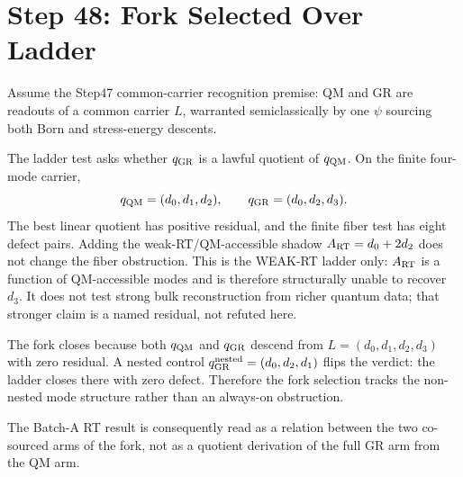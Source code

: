 \section*{Step 48: Fork Selected Over Ladder}

Assume the Step47 common-carrier recognition premise: QM and GR are readouts of
a common carrier \(L\), warranted semiclassically by one \(\psi\) sourcing both
Born and stress-energy descents.

The ladder test asks whether \(q_{\rm GR}\) is a lawful quotient of
\(q_{\rm QM}\). On the finite four-mode carrier,
\[
q_{\rm QM}=(d_0,d_1,d_2), \qquad q_{\rm GR}=(d_0,d_2,d_3).
\]
The best linear quotient has positive residual, and the finite fiber test has
eight defect pairs. Adding the weak-RT/QM-accessible shadow
\(A_{\rm RT}=d_0+2d_2\) does not change the fiber obstruction. This is the
WEAK-RT ladder only: \(A_{\rm RT}\) is a function of QM-accessible modes and is
therefore structurally unable to recover \(d_3\). It does not test strong bulk
reconstruction from richer quantum data; that stronger claim is a named
residual, not refuted here.

The fork closes because both \(q_{\rm QM}\) and \(q_{\rm GR}\) descend from
\(L=(d_0,d_1,d_2,d_3)\) with zero residual. A nested control
\(q_{\rm GR}^{\rm nested}=(d_0,d_2,d_1)\) flips the verdict: the ladder closes
there with zero defect. Therefore the fork selection tracks the non-nested
mode structure rather than an always-on obstruction.

The Batch-A RT result is consequently read as a relation between the two
co-sourced arms of the fork, not as a quotient derivation of the full GR arm
from the QM arm.
